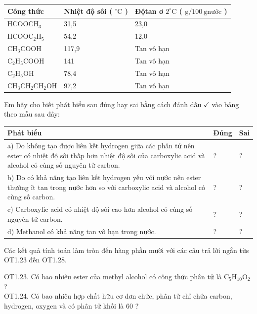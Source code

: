 \documentclass[10pt]{article}
\begin{document}
\begin{center}
\begin{tabular}{|l|l|l|}
\hline
Công thức & Nhiệt độ sôi ( ${ }^{\circ} \mathrm{C}$ ) & Độtan ơ $2^{\circ} \mathrm{C}$ ( $\mathrm{g} / 100 \mathrm{~g} \mathrm{nước}$ ) \\
\hline
$\mathrm{HCOOCH}_{3}$ & 31,5 & 23,0 \\
\hline
$\mathrm{HCOOC}_{2} \mathrm{H}_{5}$ & 54,2 & 12,0 \\
\hline
$\mathrm{CH}_{3} \mathrm{COOH}$ & 117,9 & Tan vô hạn \\
\hline
$\mathrm{C}_{2} \mathrm{H}_{5} \mathrm{COOH}$ & 141 & Tan vô hạn \\
\hline
$\mathrm{C}_{2} \mathrm{H}_{5} \mathrm{OH}$ & 78,4 & Tan vô hạn \\
\hline
$\mathrm{CH}_{3} \mathrm{CH}_{2} \mathrm{CH}_{2} \mathrm{OH}$ & 97,2 & Tan vô hạn \\
\hline
\end{tabular}
\end{center}

Em hãy cho biết phát biểu sau đúng hay sai bằng cách đánh dấu $\checkmark$ vào bảng theo mẫu sau đây:

\begin{center}
\begin{tabular}{|l|l|l|}
\hline
Phát biểu & Đúng & Sai \\
\hline
a) Do không tạo được liên kết hydrogen giữa các phân tử nên ester có nhiệt độ sôi thấp hơn nhiệt độ sôi của carboxylic acid và alcohol có cùng số nguyên tử carbon. & ? & ? \\
\hline
b) Do có khả năng tạo liên kết hydrogen yếu với nước nên ester thường ît tan trong nước hơn so với carboxylic acid và alcohol có cùng số carbon. & ? & ? \\
\hline
c) Carboxylic acid có nhiệt độ sôi cao hơn alcohol có cùng số nguyên tử carbon. & ? & ? \\
\hline
d) Methanol có khả năng tan vô hạn trong nước. & ? & ? \\
\hline
\end{tabular}
\end{center}

Các kết quả tính toán làm tròn đến hàng phần mười với các câu trả lời ngắn từs OT1.23 đến OT1.28.

OT1.23. Có bao nhiêu ester của methyl alcohol có công thức phân tử là $\mathrm{C}_{5} \mathrm{H}_{10} \mathrm{O}_{2}$ ?\\
OT1.24. Có bao nhiêu hợp chất hữu cơ đơn chức, phân tử chỉ chứa carbon, hydrogen, oxygen và có phân tử khối là 60 ?
\end{document}
